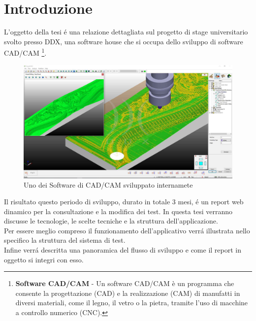\chapter{Introduzione}
    L'oggetto della tesi \'e una relazione dettagliata sul progetto di stage universitario svolto presso DDX,
    una software house che si occupa dello sviluppo di software CAD/CAM
    \footnote{\textbf{Software CAD/CAM} - Un software CAD/CAM è un programma che consente la progettazione (CAD)
    e la realizzazione (CAM) di manufatti in diversi materiali, come il legno, il vetro o la pietra, tramite 
    l'uso di macchine a controllo numerico (CNC).}.\\

    \begin{figure}[h]
        \includegraphics[width=\textwidth]{images/easywood.jpg}
        \caption{Uno dei Software di CAD/CAM sviluppato internamete}
    \end{figure}

    Il risultato questo periodo di sviluppo, durato in totale 3 mesi, \'e un report web dinamico per la consultazione e la modifica dei test. 
    In questa tesi verranno discusse le tecnologie, le scelte tecniche e la struttura dell'applicazione.\\

    Per essere meglio compreso il funzionamento dell'applicativo verr\'a illustrata nello specifico la struttura del sistema di test.\\
    Infine verr\'a descritta una panoramica del flusso di sviluppo e come il report in oggetto si integri con esso. 
